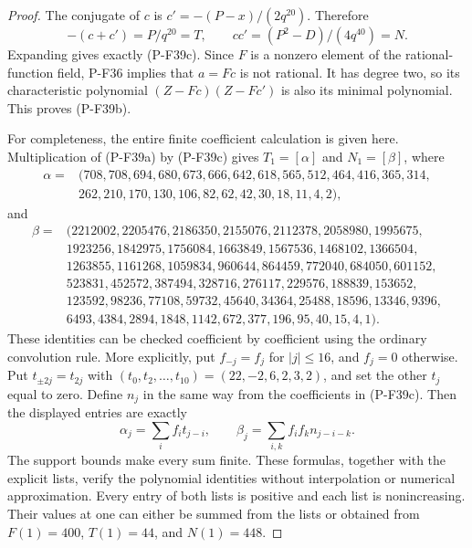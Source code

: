 \documentclass[11pt,a4paper]{article}
\begin{document}
\begin{proof}
The conjugate of $c$ is $c'=-(P-x)/(2q^{20})$. Therefore
\[
       -(c+c')=P/q^{20}=T,
 \qquad cc'=(P^2-D)/(4q^{40})=N.
 \tag{P-F39d}
\]
Expanding gives exactly (P-F39c). Since $F$ is a nonzero element
of the rational-function field, P-F36 implies that $a=Fc$ is
not rational. It has degree two, so its characteristic polynomial
$(Z-Fc)(Z-Fc')$ is also its minimal polynomial. This proves
(P-F39b).

For completeness, the entire finite coefficient calculation is
given here. Multiplication of (P-F39a) by (P-F39c) gives
$T_1=[\alpha]$ and $N_1=[\beta]$, where
\[
\begin{split}
\alpha={}&(708,708,694,680,673,666,642,618,565,512,464,416,365,314,\\
&262,210,170,130,106,82,62,42,30,18,11,4,2),
\end{split}
 \tag{P-F39e}
\]
and
\[
\begin{split}
\beta={}&(2212002,2205476,2186350,2155076,2112378,2058980,1995675,\\
&1923256,1842975,1756084,1663849,1567536,1468102,1366504,\\
&1263855,1161268,1059834,960644,864459,772040,684050,601152,\\
&523831,452572,387494,328716,276117,229576,188839,153652,\\
&123592,98236,77108,59732,45640,34364,25488,18596,13346,9396,\\
&6493,4384,2894,1848,1142,672,377,196,95,40,15,4,1).
\end{split}
 \tag{P-F39f}
\]
These identities can be checked coefficient by coefficient using
the ordinary convolution rule. More explicitly, put $f_{-j}=f_j$
for $|j|\le16$, and $f_j=0$ otherwise. Put
$t_{\pm 2j}=t_{2j}$ with $(t_0,t_2,\ldots,t_{10})=(22,-2,6,2,3,2)$,
and set the other $t_j$ equal to zero. Define $n_j$ in the same
way from the coefficients in (P-F39c). Then the displayed entries
are exactly
\[
       \alpha_j=\sum_i f_i t_{j-i},\qquad
       \beta_j=\sum_{i,k} f_i f_k n_{j-i-k}.
 \tag{P-F39g}
\]
The support bounds make every sum finite. These formulas,
together with the explicit lists, verify the polynomial identities
without interpolation or numerical approximation. Every entry
of both lists is positive and each list is nonincreasing. Their
values at one can either be summed from the lists or obtained
from $F(1)=400$, $T(1)=44$, and $N(1)=448$.


\end{proof}
\end{document}
